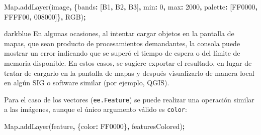 \documentclass[
  12pt,
  letterpaper,
  twoside]{book}
\newenvironment{Shaded}{\begin{snugshade}}{\end{snugshade}}
\newcommand{\BuiltInTok}[1]{#1}
\newcommand{\DataTypeTok}[1]{\textcolor[rgb]{0.13,0.29,0.53}{#1}}
\newcommand{\DecValTok}[1]{\textcolor[rgb]{0.00,0.00,0.81}{#1}}
\newcommand{\FunctionTok}[1]{\textcolor[rgb]{0.00,0.00,0.00}{#1}}
\newcommand{\NormalTok}[1]{#1}
\newcommand{\OperatorTok}[1]{\textcolor[rgb]{0.81,0.36,0.00}{\textbf{#1}}}
\newcommand{\StringTok}[1]{\textcolor[rgb]{0.31,0.60,0.02}{#1}}
\begin{document}
\begin{Shaded}
\begin{Highlighting}[]
\BuiltInTok{Map}\OperatorTok{.}\FunctionTok{addLayer}\NormalTok{(image}\OperatorTok{,}\NormalTok{ \{}\DataTypeTok{bands}\OperatorTok{:}\NormalTok{ [}\StringTok{\textquotesingle{}B1\textquotesingle{}}\OperatorTok{,} \StringTok{\textquotesingle{}B2\textquotesingle{}}\OperatorTok{,} \StringTok{\textquotesingle{}B3\textquotesingle{}}\NormalTok{]}\OperatorTok{,} 
                      \DataTypeTok{min}\OperatorTok{:} \DecValTok{0}\OperatorTok{,} \DataTypeTok{max}\OperatorTok{:} \DecValTok{2000}\OperatorTok{,} 
                      \DataTypeTok{palette}\OperatorTok{:}\NormalTok{ [}\StringTok{\textquotesingle{}FF0000\textquotesingle{}}\OperatorTok{,} \StringTok{\textquotesingle{}FFFF00\textquotesingle{}}\OperatorTok{,}\StringTok{\textquotesingle{} 008000\textquotesingle{}}\NormalTok{]\}}\OperatorTok{,} 
                      \StringTok{\textquotesingle{}RGB\textquotesingle{}}\NormalTok{)}\OperatorTok{;}
\end{Highlighting}
\end{Shaded}

\begin{bluebox2}

\begin{awesomeblock}{5pt}{\faLightbulb}{darkblue}
En algunas ocasiones, al intentar cargar objetos en la pantalla de mapas, que sean producto de procesamientos demandantes, la consola puede mostrar un error indicando que se superó el tiempo de espera o del límite de memoria disponible. En estos casos, se sugiere exportar el resultado, en lugar de tratar de cargarlo en la pantalla de mapas y después visualizarlo de manera local en algún SIG o software similar (por ejemplo, QGIS).

\end{awesomeblock}

\end{bluebox2}

Para el caso de los vectores (\texttt{ee.Feature}) se puede realizar una operación similar a las imágenes, aunque el único argumento válido es \texttt{color}:

\begin{Shaded}
\begin{Highlighting}[]
\BuiltInTok{Map}\OperatorTok{.}\FunctionTok{addLayer}\NormalTok{(feature}\OperatorTok{,}\NormalTok{ \{}\DataTypeTok{color}\OperatorTok{:} \StringTok{\textquotesingle{}FF0000\textquotesingle{}}\NormalTok{\}}\OperatorTok{,} \StringTok{\textquotesingle{}featuresColored\textquotesingle{}}\NormalTok{)}\OperatorTok{;}
\end{Highlighting}
\end{Shaded}
\end{document}
